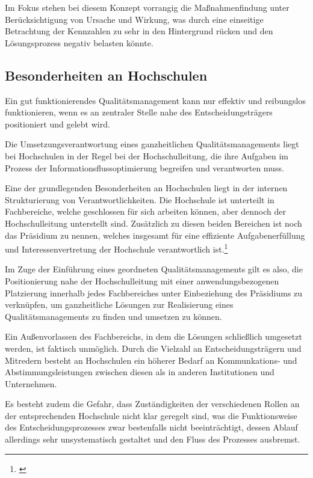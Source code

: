 Im Fokus stehen bei diesem Konzept vorrangig die Maßnahmenfindung unter Berücksichtigung von Ursache und Wirkung, was durch eine einseitige Betrachtung der Kennzahlen zu sehr in den Hintergrund rücken und den Lösungsprozess negativ belasten könnte.

\subsection{Besonderheiten an Hochschulen}
Ein gut funktionierendes Qualitätsmanagement kann nur effektiv und reibungslos funktionieren, wenn es an zentraler Stelle nahe des Entscheidungsträgers positioniert und gelebt wird.

Die Umsetzungsverantwortung eines ganzheitlichen Qualitätsmanagements liegt bei Hochschulen in der Regel bei der Hochschulleitung, die ihre Aufgaben im Prozess der Informationsflussoptimierung begreifen und verantworten muss.

Eine der grundlegenden Besonderheiten an Hochschulen liegt in der internen Strukturierung von Verantwortlichkeiten. Die Hochschule ist unterteilt in Fachbereiche, welche geschlossen für sich arbeiten können, aber dennoch der Hochschulleitung unterstellt sind. Zusätzlich zu diesen beiden Bereichen ist noch das Präsidium zu nennen, welches insgesamt für eine effiziente Aufgabenerfüllung und Interessenvertretung der Hochschule verantwortlich ist.\footnote{\cite{mintzberg_1992}}

Im Zuge der Einführung eines geordneten Qualitätsmanagements gilt es also, die Positionierung nahe der Hochschulleitung 
mit einer anwendungsbezogenen Platzierung innerhalb jedes Fachbereiches unter Einbeziehung des Präsidiums zu verknüpfen, 
um ganzheitliche Lösungen zur Realisierung eines Qualitätsmanagements zu finden und umsetzen zu können.

Ein Außenvorlassen des Fachbereichs, in dem die Lösungen schließlich umgesetzt werden, ist faktisch unmöglich. Durch die 
Vielzahl an Entscheidungsträgern und Mitredern besteht an Hochschulen ein höherer Bedarf an Kommunkations- und 
Abstimmungsleistungen zwischen diesen als in anderen Institutionen und Unternehmen. 

Es besteht zudem die Gefahr, dass Zuständigkeiten der verschiedenen Rollen an der entsprechenden Hochschule nicht klar 
geregelt sind, was die Funktionsweise des Entscheidungsprozesses zwar bestenfalls nicht beeinträchtigt, dessen Ablauf allerdings 
sehr unsystematisch gestaltet und den Fluss des Prozesses ausbremst.

